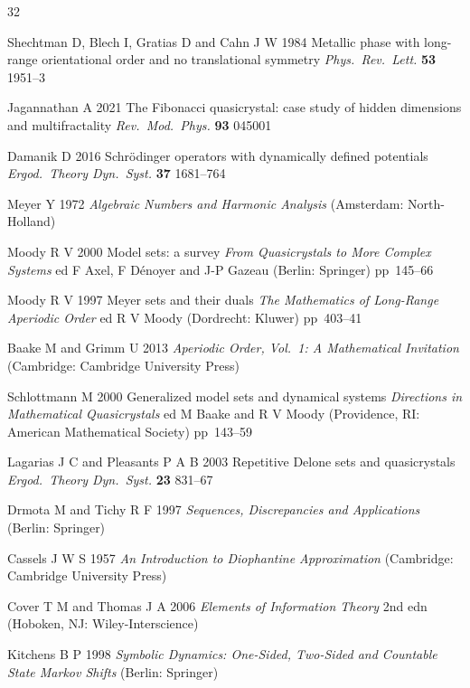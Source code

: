 \begin{thebibliography}{32}

Shechtman D, Blech I, Gratias D and Cahn J W 1984
Metallic phase with long-range orientational order and no translational symmetry
\textit{Phys.\ Rev.\ Lett.} \textbf{53} 1951--3

Jagannathan A 2021
The Fibonacci quasicrystal: case study of hidden dimensions and multifractality
\textit{Rev.\ Mod.\ Phys.} \textbf{93} 045001

Damanik D 2016
Schr\"odinger operators with dynamically defined potentials
\textit{Ergod.\ Theory Dyn.\ Syst.} \textbf{37} 1681--764

Meyer Y 1972
\textit{Algebraic Numbers and Harmonic Analysis}
(Amsterdam: North-Holland)

Moody R V 2000
Model sets: a survey
\textit{From Quasicrystals to More Complex Systems}
ed F Axel, F D\'enoyer and J-P Gazeau
(Berlin: Springer) pp~145--66

Moody R V 1997
Meyer sets and their duals
\textit{The Mathematics of Long-Range Aperiodic Order}
ed R V Moody
(Dordrecht: Kluwer) pp~403--41

Baake M and Grimm U 2013
\textit{Aperiodic Order, Vol.~1: A Mathematical Invitation}
(Cambridge: Cambridge University Press)

Schlottmann M 2000
Generalized model sets and dynamical systems
\textit{Directions in Mathematical Quasicrystals}
ed M Baake and R V Moody
(Providence, RI: American Mathematical Society) pp~143--59

Lagarias J C and Pleasants P A B 2003
Repetitive Delone sets and quasicrystals
\textit{Ergod.\ Theory Dyn.\ Syst.} \textbf{23} 831--67

Drmota M and Tichy R F 1997
\textit{Sequences, Discrepancies and Applications}
(Berlin: Springer)

Cassels J W S 1957
\textit{An Introduction to Diophantine Approximation}
(Cambridge: Cambridge University Press)

Cover T M and Thomas J A 2006
\textit{Elements of Information Theory} 2nd edn
(Hoboken, NJ: Wiley-Interscience)

Kitchens B P 1998
\textit{Symbolic Dynamics: One-Sided, Two-Sided and Countable State Markov Shifts}
(Berlin: Springer)


\end{thebibliography}
